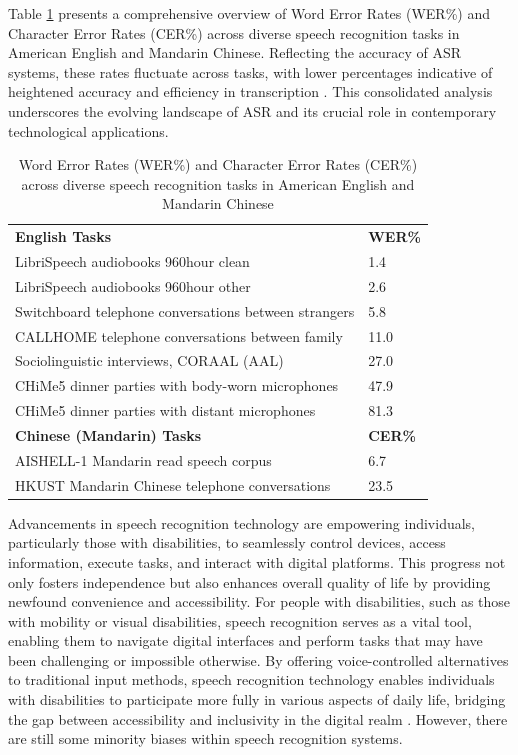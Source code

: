 \documentclass{l4proj}
\begin{document}
Table \ref{tab:ASR} presents a comprehensive overview of Word Error Rates (WER\%) and Character Error Rates (CER\%) across diverse speech recognition tasks in American English and Mandarin Chinese. Reflecting the accuracy of ASR systems, these rates fluctuate across tasks, with lower percentages indicative of heightened accuracy and efficiency in transcription \citep{jurafskyspeech}. This consolidated analysis underscores the evolving landscape of ASR and its crucial role in contemporary technological applications.

\begin{table}[htbp]
    \caption{Word Error Rates (WER\%) and Character Error Rates (CER\%) across diverse speech recognition tasks in American English and Mandarin Chinese}\label{tab:ASR}
    \begin{tabular}{@{}ll@{}}
    \textbf{English Tasks} & \textbf{WER\%} \\ 
    LibriSpeech audiobooks 960hour clean &  1.4 \\ 
    LibriSpeech audiobooks 960hour other &  2.6 \\ 
    Switchboard telephone conversations between strangers &  5.8 \\ 
    CALLHOME telephone conversations between family & 11.0 \\ 
    Sociolinguistic interviews, CORAAL (AAL) & 27.0 \\
    CHiMe5 dinner parties with body-worn microphones & 47.9 \\
    CHiMe5 dinner parties with distant microphones & 81.3 \\
    \textbf{Chinese (Mandarin) Tasks} & \textbf{CER\%} \\
    AISHELL-1 Mandarin read speech corpus & 6.7 \\
    HKUST Mandarin Chinese telephone conversations & 23.5 \\
\end{tabular}
\end{table}

Advancements in speech recognition technology are empowering individuals, particularly those with disabilities, to seamlessly control devices, access information, execute tasks, and interact with digital platforms. This progress not only fosters independence but also enhances overall quality of life by providing newfound convenience and accessibility. For people with disabilities, such as those with mobility or visual disabilities, speech recognition serves as a vital tool, enabling them to navigate digital interfaces and perform tasks that may have been challenging or impossible otherwise. By offering voice-controlled alternatives to traditional input methods, speech recognition technology enables individuals with disabilities to participate more fully in various aspects of daily life, bridging the gap between accessibility and inclusivity in the digital realm \citep{semary2024using}. However, there are still some minority biases within speech recognition systems. 
\end{document}
